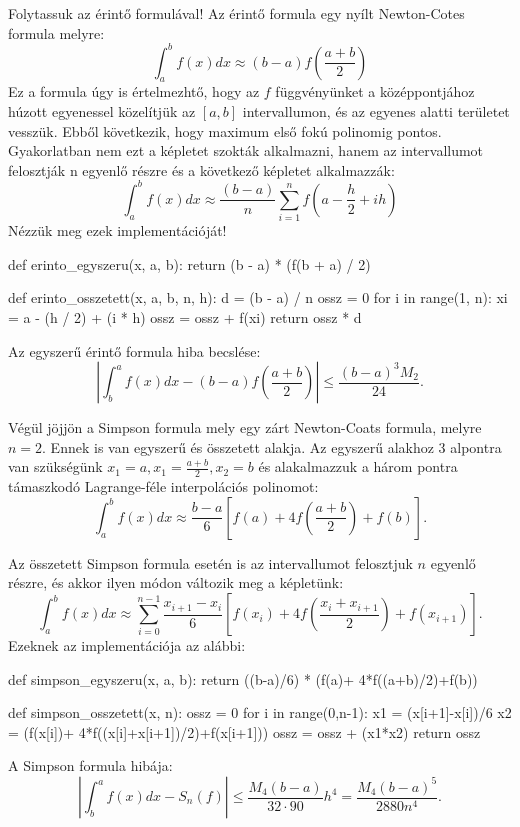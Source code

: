     Folytassuk az érintő formulával! Az érintő formula egy nyílt
Newton-Cotes formula melyre:
\[
\int^b_a f(x)dx \approx (b-a)f\left( \frac{a+b}{2}\right)
\]
Ez a formula úgy is értelmezhtő, hogy az \(f\) függvényünket a
középpontjához húzott egyenessel közelítjük az \([a, b]\) intervallumon,
és az egyenes alatti területet vesszük. Ebből következik, hogy maximum
első fokú polinomig pontos. Gyakorlatban nem ezt a képletet szokták
alkalmazni, hanem az intervallumot felosztják n egyenlő részre és a következő
képletet alkalmazzák:
\[
\int^b_a f(x)dx \approx \frac{(b-a)}{n}\sum^{n}_{i=1}f\left( a-\frac{h}{2}+ih\right)
\]
Nézzük meg ezek implementációját!
\begin{python}
def erinto_egyszeru(x, a, b):  
    return (b - a) * (f(b + a) / 2)

def erinto_osszetett(x, a, b, n, h):
    d = (b - a) / n
    ossz = 0
    for i in range(1, n):
        xi = a - (h / 2) + (i * h)
        ossz = ossz + f(xi)
    return ossz * d
\end{python}
Az egyszerű érintő formula hiba becslése:
\[
\left| \int^a_b f(x)dx-(b-a) f \left( \frac{a+b}{2} \right)\right| \leq \frac {(b-a)^3M_2}{24}.
\]

    Végül jöjjön a Simpson formula mely egy zárt Newton-Coats formula, melyre
\(n=2\). Ennek is van egyszerű és összetett alakja. Az egyszerű alakhoz
3 alpontra van szükségünk \(x_1=a, x_1=\frac {a+b}{2}, x_2=b\) és
alakalmazzuk a három pontra támaszkodó Lagrange-féle interpolációs
polinomot:
\[
\int^b_a f(x)dx \approx \frac{b-a}{6} \left[f(a)+4f\left(\frac{a+b}{2}\right)+f(b)\right].
\]

Az összetett Simpson formula esetén is az intervallumot felosztjuk \(n\)
egyenlő részre, és akkor ilyen módon változik meg a képletünk:
\[
\int^b_a f(x)dx \approx \sum^{n-1}_{i=0}\frac{x_{i+1}-x_i}{6}
\left[
f(x_i) + 4f\left( \frac{x_i+x_{i+1}}{2}\right)+ f({x_{i+1}})
\right].
\]
Ezeknek az implementációja az alábbi:
\begin{python}
def simpson_egyszeru(x, a, b):  
    return ((b-a)/6) * (f(a)+ 4*f((a+b)/2)+f(b)) 
    
def simpson_osszetett(x, n):
    ossz = 0
    for i in range(0,n-1):
        x1 = (x[i+1]-x[i])/6
        x2 = (f(x[i])+ 4*f((x[i]+x[i+1])/2)+f(x[i+1]))
        ossz = ossz + (x1*x2)
    return ossz
\end{python}
A Simpson formula hibája:
\[
\left|\int^a_b f(x)dx- S_n(f)\right| \leq \frac {M_4(b-a)}{32 \cdot 90}h^4 = \frac {M_4(b-a)^5}{2880n^4}.
\]
